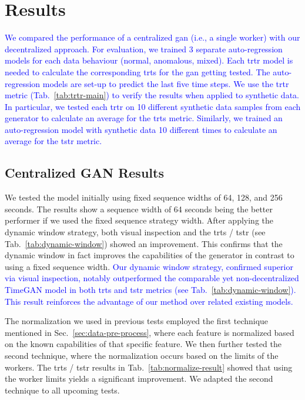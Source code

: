 \section{Results}


\textcolor{blue}{We compared the performance of a centralized \gls*{gan} (i.e., a single worker) with our decentralized approach. For evaluation, we trained 3 separate auto-regression models for each data behaviour (normal, anomalous, mixed). Each \gls*{trtr} model is needed to calculate the corresponding \gls*{trts} for the \gls*{gan} getting tested. The auto-regression models are set-up to predict the last five time steps.
%
We use the \gls*{trtr} metric (Tab.~\ref{tab:trtr-main}) to verify the results when applied to synthetic data. In particular, we tested each \gls*{trtr} on 10 different synthetic data samples from each generator to calculate an average for the \gls*{trts} metric. Similarly, we trained an auto-regression model with synthetic data 10 different times to calculate an average for the \gls*{tstr} metric.}


\subsection{Centralized GAN Results}

We tested the model initially using fixed sequence widths of 64, 128, and 256 seconds. The results show a sequence width of 64 seconds being the better performer if we used the fixed sequence strategy width. After applying the dynamic window strategy, both visual inspection and the \gls*{trts} / \gls*{tstr} (see Tab.~\ref{tab:dynamic-window}) showed an improvement. This confirms that the dynamic window in fact improves the capabilities of the generator in contrast to using a fixed sequence width. \textcolor{blue}{Our dynamic window strategy, confirmed superior via visual inspection, notably outperformed the comparable yet non-decentralized TimeGAN model in both \gls*{trts} and \gls*{tstr} metrics (see Tab.~\ref{tab:dynamic-window}). This result reinforces the advantage of our method over related existing models.}


%
The normalization we used in previous tests employed the first technique mentioned in Sec.~\ref{sec:data-pre-process}, where each feature is normalized based on the known capabilities of that specific feature. We then further tested the second technique, where the normalization occurs based on the limits of the workers. The \gls*{trts} / \gls*{tstr} results in Tab.~\ref{tab:normalize-result} showed that using the worker limits yields a significant improvement. We adapted the second technique to all upcoming tests.



